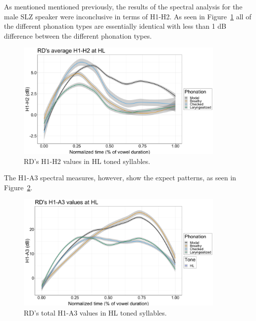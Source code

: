 \documentclass[12pt, letterpaper]{article}
\begin{document}
As mentioned mentioned previously, the results of the spectral analysis for the male SLZ speaker were inconclusive in terms of H1-H2. As seen in Figure~\ref{fig:RDh1h2} all of the different phonation types are essentially identical with less than 1 dB difference between the different phonation types. 
\begin{figure}[!ht]
	\includegraphics[width=0.9\textwidth]{../RDh1h2_line_HL.png}
	\caption{RD's H1-H2 values in HL toned syllables.}
	\label{fig:RDh1h2} 
\end{figure}
The H1-A3 spectral measures, however, show the expect patterns, as seen in Figure~\ref{fig:RDh1a3}. 
\begin{figure}[!ht]
	\includegraphics[width=0.9\textwidth]{../RDH1A3_HL.png}
	\caption{RD's total H1-A3 values in HL toned syllables. }
	\label{fig:RDh1a3} 
\end{figure}

\end{document}
